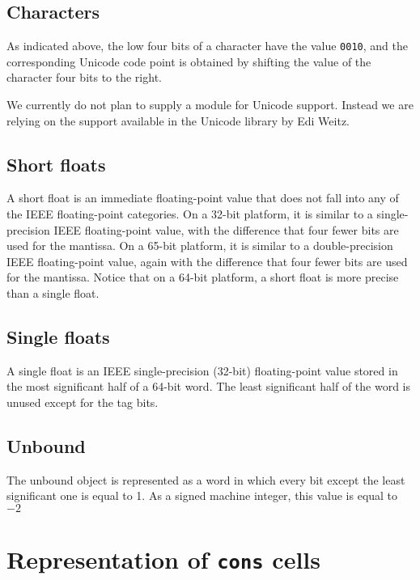 \subsection{Characters}

As indicated above, the low four bits of a character have the value
\texttt{0010}, and the corresponding Unicode code point is obtained by
shifting the value of the character four bits to the right. 

We currently do not plan to supply a module for Unicode support.
Instead we are relying on the support available in the Unicode library
by Edi Weitz.

\subsection{Short floats}

A short float is an immediate floating-point value that does not fall
into any of the IEEE floating-point categories.  On a 32-bit platform,
it is similar to a single-precision IEEE floating-point value, with
the difference that four fewer bits are used for the mantissa.  On a
65-bit platform, it is similar to a double-precision IEEE
floating-point value, again with the difference that four fewer bits
are used for the mantissa.  Notice that on a 64-bit platform, a short
float is more precise than a single float. 

\subsection{Single floats}

A single float is an IEEE single-precision (32-bit) floating-point
value stored in the most significant half of a 64-bit word.  The least
significant half of the word is unused except for the tag bits. 

\subsection{Unbound}
\label{data-representation-unbound}

The unbound object is represented as a word in which every bit except
the least significant one is equal to 1.  As a signed machine integer,
this value is equal to $-2$

\section{Representation of \texttt{cons} cells}

